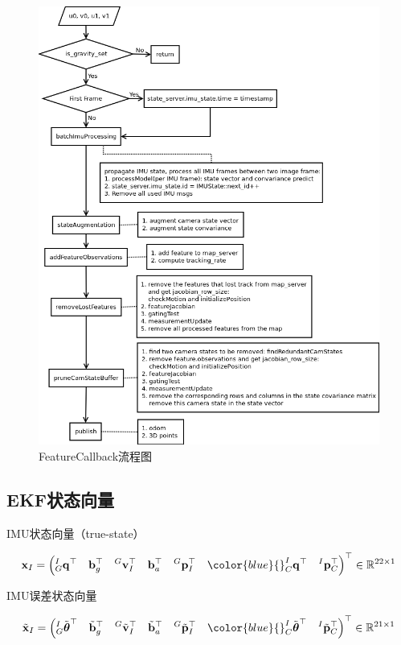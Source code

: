 \documentclass[12pt,a4paper]{article}
\begin{document}
\begin{figure}[htbp]
\centering
\includegraphics[scale=0.7]{images/feature_cb.png}
\caption{FeatureCallback流程图}
\end{figure}

\newpage
\subsection{EKF状态向量}

IMU状态向量（true-state）

\begin{equation*}
\mathbf{x}_{I} = 
\left(
{}^I_G \mathbf{q}^\top \quad 
\mathbf{b}_g^\top \quad 
{}^G\mathbf{v}^\top_I \quad 
\mathbf{b}_a^\top \quad
{}^G\mathbf{p}^\top_I \quad
{\color{blue}
{}^I_C \mathbf{q}^\top \quad
{}^I\mathbf{p}^\top_C}
\right)^\top
\in \mathbb{R}^{22 \times 1}
\end{equation*}

IMU误差状态向量

\begin{equation*}
\tilde{\mathbf{x}}_{I} = 
\left(
{}^I_G \tilde{\boldsymbol{\theta}}^\top \quad 
\tilde{\mathbf{b}}_g^\top \quad 
{}^G\tilde{\mathbf{v}}^\top_I \quad 
\tilde{\mathbf{b}}_a^\top \quad
{}^G\tilde{\mathbf{p}}^\top_I \quad
{\color{blue}
{}^I_C \tilde{\boldsymbol{\theta}}^\top \quad
{}^I\tilde{\mathbf{p}}^\top_C}
\right)^\top 
\in \mathbb{R}^{21 \times 1}
\end{equation*}
\end{document}
